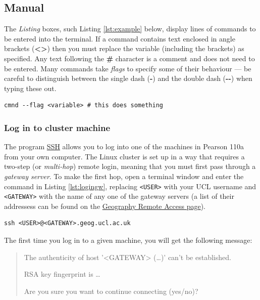 \documentclass[a4paper]{article}
\newenvironment{ttt}{\ttfamily}{\par} %
\begin{document}
\subsection{Manual}
\label{sec:manual}

The \emph{Listing} boxes, such Listing \ref{lst:example} below, display lines of commands to be entered into the terminal.
If a command contains text enclosed in angle brackets (\textbf{\textless{}\textgreater{}}) then you must replace the variable (including the brackets) as specified.
Any text following the \textbf{\#} character is a comment and does not need to be entered.
Many commands take \emph{flags} to specify some of their behaviour --- be careful to distinguish between the single dash (\textbf{-}) and the double dash (\textbf{-{}-}) when typing these out.
\begin{lstlisting}[caption={An example of a command}, label={lst:example}]
cmnd --flag <variable> # this does something
\end{lstlisting}

\subsubsection{Log in to cluster machine}
\label{sec:login}
The program \href{http://linuxcommand.org/man_pages/ssh1.html}{SSH} allows you to log into one of the machines in Pearson 110a from your own computer.
The Linux cluster is set up in a way that requires a two-step (or \emph{multi-hop}) remote login, meaning that you must first pass through a \emph{gateway server}. 
To make the first hop, open a terminal window and enter the command in Listing \ref{lst:logingw}, replacing \texttt{\textless{}USER\textgreater{}} with your UCL username and \texttt{\textless{}GATEWAY\textgreater{}} with the name of any one of the gateway servers (a list of their addressess can be found on the \href{http://www.geog.ucl.ac.uk/resources/computer-support/linux-remote-access}{Geography Remote Access page}).

\begin{lstlisting}[caption={Login to gateway}, label={lst:logingw}]
ssh <USER>@<GATEWAY>.geog.ucl.ac.uk
\end{lstlisting}

The first time you log in to a given machine, you will get the following message:

\begin{quote}
\begin{ttt}
The authenticity of host '\textless{}GATEWAY\textgreater{} (\ldots)' can't be established.

RSA key fingerprint is \ldots{}

Are you sure you want to continue connecting (yes/no)?
\end{ttt}
\end{quote}
\end{document}
